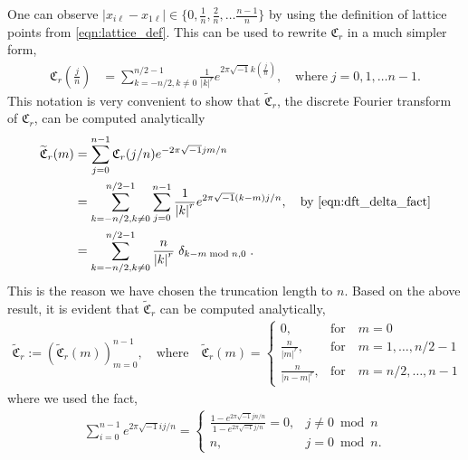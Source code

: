 \documentclass{svjour3}                     %
\newcommand{\bm}[1]{\boldsymbol{#1}}
\def\abs#1{\ensuremath{\left \lvert #1 \right \rvert}}
\begin{document}
One can observe
$\abs{x_{i\ell}-x_{1\ell}} \in \lbrace 0, \frac 1n, \frac 2n, \dots \frac{n-1}{n}  \rbrace$ by using the definition of lattice points from \eqref{eqn:lattice_def}. This can be used to rewrite $\mathfrak{C}_r$ in a much simpler form,
\begin{align*}
\mathfrak{C}_r \left(\frac jn \right) &= \sum_{k = - n/2, k \neq 0 }^{n/2 - 1} \frac{1}{\abs{k}^r} 
e^{ 2 \pi\sqrt{-1} k (\frac jn)}, \quad \text{where} \;  j=0,1,\dots n-1.
\end{align*}
This notation is very convenient to show that $\widetilde{\mathfrak{C}}_r$,  the discrete Fourier transform of $\mathfrak{C}_r$, can be computed analytically
\begin{align*}
\widetilde{\mathfrak{C}}_r(m) &= \sum_{j=0}^{n-1} \mathfrak{C}_r (j/n) e^{- 2 \pi\sqrt{-1} jm/n} 
\\
&= \sum_{k = - n/2, k \neq 0 }^{n/2-1} 
\sum_{j=0}^{n-1} \frac{1}{\abs{k}^r} e^{ 2 \pi\sqrt{-1} (k-m)  j/n} , \quad \text{by \eqref{eqn:dft_delta_fact}}
\\
&= \sum_{k = - n/2, k \neq 0  }^{n/2-1} \frac{n}{\abs{k}^r} \; \delta_{k-m \bmod n, 0} \; .
\end{align*}
This is the reason we have chosen the truncation length to $n$. 
Based on the above result, it is evident that $\widetilde{\mathfrak{C}}_r$ can be computed analytically,
\begin{align} \label{dft_of_g}
\widetilde{\bm{\mathfrak{C}}}_r := \left(\widetilde{\mathfrak{C}}_{r}(m)\right)_{m=0}^{n-1}, \quad
\text{where} \quad
\widetilde{\mathfrak{C}}_r(m) = 
\begin{cases}
0, & \text{for} \quad m=0 \\
\frac{n}{\abs{m}^r}, & \text{for} \quad m=1,\dots,n/2-1 \\
\frac{n}{\abs{n-m}^r}, & \text{for} \quad m=n/2,\dots,n-1
\end{cases}
\end{align}
where we used the fact,
\begin{align}
\label{eqn:dft_delta_fact}
\sum_{i=0}^{n-1} e^{2 \pi \sqrt{-1} i j /n} = 
\begin{cases}
\frac{1 - e^{2\pi \sqrt{-1} j n /n}}{1 - e^{2\pi \sqrt{-1} j /n}} = 0, &j \ne 0 \bmod n
\\
n, & j = 0 \bmod n.
\end{cases}
\end{align}
\end{document}
